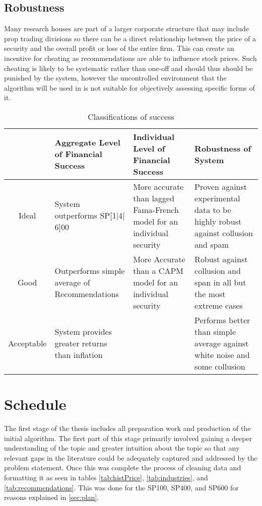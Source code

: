\subsection{Robustness}
Many research houses are part of a larger corporate structure that may include prop trading divisions so there can be a direct relationship between the price of a security and the overall profit or loss of the entire firm. This can create an incentive for cheating as recommendations are able to influence stock prices. Such cheating is likely to be systematic rather than one-off and should thus should be punished by the system, however the uncontrolled environment that the algorithm will be used in is not suitable for objectively assessing specific forms of it. 

\begin{table}[p]
    \centering
    \begin{tabularx}{0.95\textwidth}{@{\extracolsep{\fill}}cXXX}
        \toprule\toprule
         & Aggregate Level of Financial Success  &Individual Level of Financial Success & Robustness of System \\\midrule
        Ideal & System outperforms SP[1$|$4$|$6]00 & More accurate than lagged Fama-French model for an individual security & Proven against experimental data to be highly robust against collusion and spam\\
        \addlinespace
        Good & Outperforms simple average of Recommendations & More Accurate than a CAPM model for an individual security & Robust against collusion and span in all but the most extreme cases\\
        \addlinespace
        Acceptable & System provides greater returns than inflation && Performs better than simple average against white noise and some collusion \\ \bottomrule
    \end{tabularx}
    \caption{Classifications of success}
    \label{tab:success}
\end{table}


\section{Schedule}
The first stage of the thesis includes all preparation work and production of the initial algorithm. The first part of this stage primarily involved gaining a deeper understanding of the topic and greater intuition about the topic so that any relevant gaps in the literature could be adequately captured and addressed by the problem statement. Once this was complete the process of cleaning data and formatting it as seen in tables \ref{tab:histPrice}, \ref{tab:industries}, and \ref{tab:recommendations}. This was done for the SP100, SP400, and SP600 for reasons explained in \ref{sec:plan}. 

